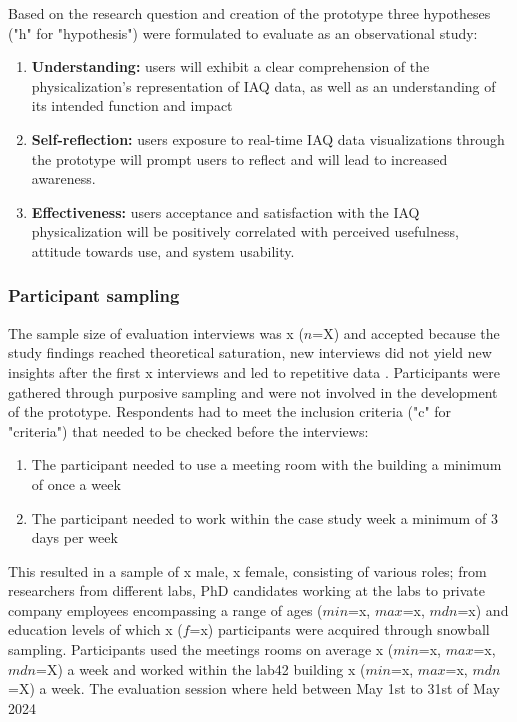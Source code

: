 Based on the research question and creation of the prototype three hypotheses ("h" for "hypothesis") were formulated to evaluate as an observational study:

\begin{enumerate}
    \renewcommand{\labelenumi}{H\arabic{enumi}:}
    \item \textbf{Understanding:} users will exhibit a clear comprehension of the physicalization's representation of IAQ data, as well as an understanding of its intended function and impact
    \item \textbf{Self-reflection:} users exposure to real-time IAQ data visualizations through the prototype will prompt users to reflect and will lead to increased awareness.
    \item \textbf{Effectiveness:} users acceptance and satisfaction with the IAQ physicalization will be positively correlated with perceived usefulness, attitude towards use, and system usability.
\end{enumerate}

\subsubsection{Participant sampling}

The sample size of evaluation interviews was x ($n$=X) and accepted because the study findings reached theoretical saturation, new interviews did not yield new insights after the first x interviews and led to repetitive data \cite{steph_menken_introduction_2016}. Participants were gathered through purposive sampling and were not involved in the development of the prototype. Respondents had to meet the inclusion criteria ("c" for "criteria") that needed to be checked before the interviews: 

\begin{enumerate}
    \renewcommand{\labelenumi}{C\arabic{enumi}:}
    \item The participant needed to use a meeting room with the building a minimum of once a week
    \item The participant needed to work within the case study week a minimum of 3 days per week
\end{enumerate}

This resulted in a sample of x male, x female, consisting of various roles; from researchers from different labs, PhD candidates working at the labs to private company employees encompassing a range of ages ($min$=x, $max$=x, $mdn$=x) and education levels of which x ($f$=x) participants were acquired through snowball sampling. Participants used the meetings rooms on average x ($min$=x, $max$=x, $mdn$=X) a week and worked within the lab42 building x ($min$=x, $max$=x, $mdn$=X) a week. The evaluation session where held between May 1st to 31st of May 2024

